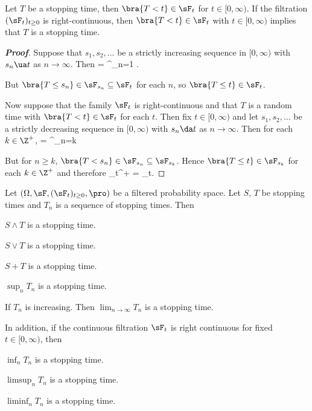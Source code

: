\begin{proposition}\label{pro:stopping_time_strictly_smaller_than_t_measurable}
Let $T$ be a stopping time, then $\bra{T<t} \in \sF_t$ for $t\in [0,\infty)$. If the filtration $(\sF_t)_{t\geq 0}$ is right-continuous, then $\bra{T<t}\in \sF_t$ with $t\in [0,\infty)$ implies that $T$ is a stopping time.
\end{proposition}

\begin{proof}[\bf Proof]
Suppose that $s_1,s_2,\dots$ be a strictly increasing sequence in $[0,\infty)$ with $s_n\ua t$ as $n\to\infty$. Then
\be
{} = \bigcup^\infty_{n=1} .
\ee

But $\bra{T\leq s_n} \in \sF_{s_n} \subseteq \sF_t$ for each $n$, so $\bra{T\leq t} \in \sF_t$.

Now suppose that the family $\sF_t$ is right-continuous and that $T$ is a random time with $\bra{T<t}\in \sF_t$ for each $t$. Then fix $t\in [0,\infty)$ and let $s_1,s_2,\dots$ be a strictly decreasing sequence in $[0,\infty)$ with $s_n\da t$ as $n\to \infty$. Then for each $k\in \Z^+$,
\be
{} = \bigcap^\infty_{n=k} 
\ee

But for $n\geq k$, $\bra{T<s_n} \in \sF_{s_n} \subseteq \sF_{s_k}$. Hence $\bra{T\leq t} \in \sF_{s_k}$ for each $k\in \Z^+$ and therefore
\be
{} \in \sF_{t^+} = \sF_t.
\ee
\end{proof}



\begin{proposition}\label{pro:stopping_time_property_continuous}
Let $(\Omega,\sF, (\sF_t)_{t\geq 0},\pro)$ be a filtered probability space. Let $S$, $T$ be stopping times and $T_n$ is a sequence of stopping times. Then
\ben
\item [(i)] $S \land T$ is a stopping time.
\item [(ii)] $S\lor T$ is a stopping time.
\item [(iii)] $S+T$ is a stopping time.
\item [(iv)] $\sup_n T_n$ is a stopping time.
\item [(v)] If $T_n$ is increasing. Then $\lim_{n\to \infty}T_n$ is a stopping time.
\een

In addition, if the continuous filtration $\sF_t$ is right continuous for fixed $t\in [0,\infty)$, then
\ben
\item [(vi)] $\inf_n T_n$ is a stopping time.
\item [(vii)] $\limsup_n T_n$ is a stopping time.
\item [(viii)] $\liminf_n T_n$ is a stopping time.
\een
\end{proposition}

